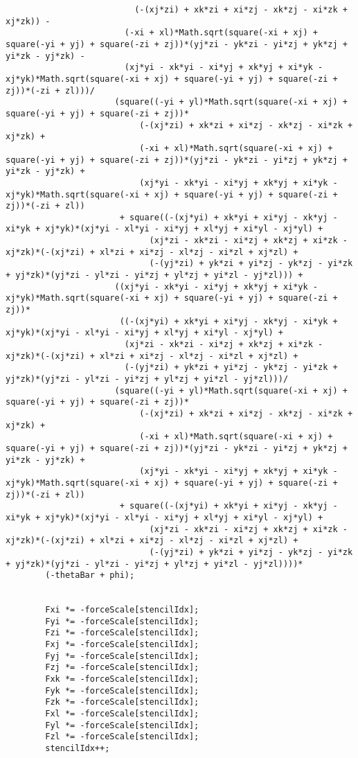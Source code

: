 \begin{lstlisting}
						  (-(xj*zi) + xk*zi + xi*zj - xk*zj - xi*zk + xj*zk)) - 
						(-xi + xl)*Math.sqrt(square(-xi + xj) + square(-yi + yj) + square(-zi + zj))*(yj*zi - yk*zi - yi*zj + yk*zj + yi*zk - yj*zk) - 
						(xj*yi - xk*yi - xi*yj + xk*yj + xi*yk - xj*yk)*Math.sqrt(square(-xi + xj) + square(-yi + yj) + square(-zi + zj))*(-zi + zl)))/
					  (square((-yi + yl)*Math.sqrt(square(-xi + xj) + square(-yi + yj) + square(-zi + zj))*
						   (-(xj*zi) + xk*zi + xi*zj - xk*zj - xi*zk + xj*zk) + 
						   (-xi + xl)*Math.sqrt(square(-xi + xj) + square(-yi + yj) + square(-zi + zj))*(yj*zi - yk*zi - yi*zj + yk*zj + yi*zk - yj*zk) + 
						   (xj*yi - xk*yi - xi*yj + xk*yj + xi*yk - xj*yk)*Math.sqrt(square(-xi + xj) + square(-yi + yj) + square(-zi + zj))*(-zi + zl))
					   + square((-(xj*yi) + xk*yi + xi*yj - xk*yj - xi*yk + xj*yk)*(xj*yi - xl*yi - xi*yj + xl*yj + xi*yl - xj*yl) + 
							 (xj*zi - xk*zi - xi*zj + xk*zj + xi*zk - xj*zk)*(-(xj*zi) + xl*zi + xi*zj - xl*zj - xi*zl + xj*zl) + 
							 (-(yj*zi) + yk*zi + yi*zj - yk*zj - yi*zk + yj*zk)*(yj*zi - yl*zi - yi*zj + yl*zj + yi*zl - yj*zl))) + 
					  ((xj*yi - xk*yi - xi*yj + xk*yj + xi*yk - xj*yk)*Math.sqrt(square(-xi + xj) + square(-yi + yj) + square(-zi + zj))*
					   ((-(xj*yi) + xk*yi + xi*yj - xk*yj - xi*yk + xj*yk)*(xj*yi - xl*yi - xi*yj + xl*yj + xi*yl - xj*yl) + 
						(xj*zi - xk*zi - xi*zj + xk*zj + xi*zk - xj*zk)*(-(xj*zi) + xl*zi + xi*zj - xl*zj - xi*zl + xj*zl) + 
						(-(yj*zi) + yk*zi + yi*zj - yk*zj - yi*zk + yj*zk)*(yj*zi - yl*zi - yi*zj + yl*zj + yi*zl - yj*zl)))/
					  (square((-yi + yl)*Math.sqrt(square(-xi + xj) + square(-yi + yj) + square(-zi + zj))*
						   (-(xj*zi) + xk*zi + xi*zj - xk*zj - xi*zk + xj*zk) + 
						   (-xi + xl)*Math.sqrt(square(-xi + xj) + square(-yi + yj) + square(-zi + zj))*(yj*zi - yk*zi - yi*zj + yk*zj + yi*zk - yj*zk) + 
						   (xj*yi - xk*yi - xi*yj + xk*yj + xi*yk - xj*yk)*Math.sqrt(square(-xi + xj) + square(-yi + yj) + square(-zi + zj))*(-zi + zl))
					   + square((-(xj*yi) + xk*yi + xi*yj - xk*yj - xi*yk + xj*yk)*(xj*yi - xl*yi - xi*yj + xl*yj + xi*yl - xj*yl) + 
							 (xj*zi - xk*zi - xi*zj + xk*zj + xi*zk - xj*zk)*(-(xj*zi) + xl*zi + xi*zj - xl*zj - xi*zl + xj*zl) + 
							 (-(yj*zi) + yk*zi + yi*zj - yk*zj - yi*zk + yj*zk)*(yj*zi - yl*zi - yi*zj + yl*zj + yi*zl - yj*zl))))*
		(-thetaBar + phi);
		
				
		Fxi *= -forceScale[stencilIdx];
		Fyi *= -forceScale[stencilIdx];
		Fzi *= -forceScale[stencilIdx];
		Fxj *= -forceScale[stencilIdx];
		Fyj *= -forceScale[stencilIdx];
		Fzj *= -forceScale[stencilIdx];
		Fxk *= -forceScale[stencilIdx];
		Fyk *= -forceScale[stencilIdx];
		Fzk *= -forceScale[stencilIdx];
		Fxl *= -forceScale[stencilIdx];
		Fyl *= -forceScale[stencilIdx];
		Fzl *= -forceScale[stencilIdx];
		stencilIdx++;
		

\end{lstlisting}
